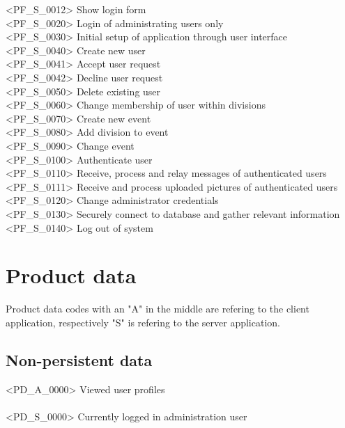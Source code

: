 <PF\_S\_0012> Show login form \\
<PF\_S\_0020> Login of administrating users only \\
<PF\_S\_0030> Initial setup of application through user interface \\
<PF\_S\_0040> Create new user \\
<PF\_S\_0041> Accept user request \\
<PF\_S\_0042> Decline user request \\
<PF\_S\_0050> Delete existing user \\
<PF\_S\_0060> Change membership of user within divisions \\
<PF\_S\_0070> Create new event \\
<PF\_S\_0080> Add division to event \\
<PF\_S\_0090> Change event \\
<PF\_S\_0100> Authenticate user \\
<PF\_S\_0110> Receive, process and relay messages of authenticated users \\
<PF\_S\_0111> Receive and process uploaded pictures of authenticated users \\
<PF\_S\_0120> Change administrator credentials \\
<PF\_S\_0130> Securely connect to database and gather relevant information \\
<PF\_S\_0140> Log out of system  \\

\chapter{Product data}
Product data codes with an "A" in the middle are refering to the client application, respectively "S" is refering to the server application. 


\section{Non-persistent data}
<PD\_A\_0000> Viewed user profiles \\
\\
<PD\_S\_0000> Currently logged in administration user \\


